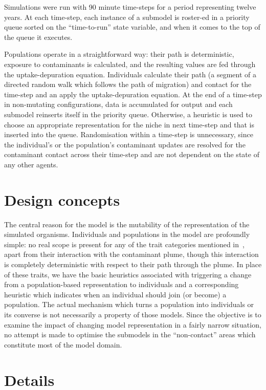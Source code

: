 Simulations were run with 90 minute time-steps for a period representing twelve
years. At each time-step, each instance of a submodel is roster-ed in a
priority queue sorted on the ``time-to-run'' state variable, and when it comes
to the top of the queue it executes.

Populations operate in a straightforward way: their path is deterministic,
exposure to contaminants is calculated, and the resulting values are fed
through the uptake-depuration equation. Individuals calculate their path (a
segment of a directed random walk which follows the path of migration) and
contact for the time-step and an apply the uptake-depuration equation. At the
end of a time-step in non-mutating configurations, data is accumulated for
output and each submodel reinserts itself in the priority queue. Otherwise, a
heuristic is used to choose an appropriate representation for the niche in
next time-step and that is inserted into the queue. Randomisation within a
time-step is unnecessary, since the individual's or the population's
contaminant updates are resolved for the contaminant contact across their
time-step and are not dependent on the state of any other agents.

\section{Design concepts}

The central reason for the model is the mutability of the representation of
the simulated organisms. Individuals and populations in the model are
profoundly simple: no real scope is present for any of the trait categories
mentioned in~\citet{Grimm06:1}, apart from their interaction with the
contaminant plume, though this interaction is completely deterministic with
respect to their path through the plume. In place of these traits, we have the
basic heuristics associated with triggering a change from a population-based
representation to individuals and a corresponding heuristic which indicates
when an individual should join (or become) a population. The actual mechanism
which turns a population into individuals or its converse is not necessarily a
property of those models. Since the objective is to examine the impact of
changing model representation in a fairly narrow situation, no attempt is made
to optimise the submodels in the ``non-contact'' areas which constitute most
of the model domain.


\section{Details}

